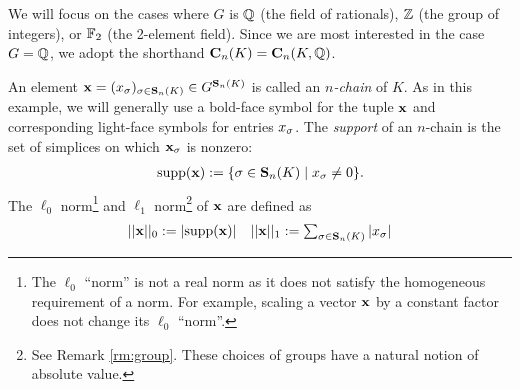 \begin{remark}\label{rm:group}
We will focus on the cases where $G$ is $\mathbb{Q}$ (the field of rationals), $\mathbb{Z}$ (the group of integers), or $\mathbb{F}_2$ (the 2-element field).  Since we are most interested in the case $G = \mathbb{Q}$, we adopt the shorthand $\mathbf{C}_n(K) = \mathbf{C}_n(K,\mathbb{Q})$. 
\end{remark}

An element $\mathbf{x} = (x_\sigma)_{\sigma \in \mathbf{S}_n(K)} \in G^{\mathbf{S}_n(K)}$ is called an \emph{$n$-chain} of $K$.   As  in this example, we will generally use a bold-face symbol for the tuple $\mathbf{x}$ and corresponding light-face symbols for entries $x_\sigma$.  The \emph{support} of an $n$-chain is the set of simplices on which $\mathbf{x}_\sigma$ is nonzero:  
%
    \begin{align*}
        \mathrm{supp}(\mathbf{x})  :=\{ \sigma \in \mathbf{S}_n(K) \mid x_\sigma \neq 0 \}.
    \end{align*}
%
The $\ell_0$ norm\footnote{The $\ell_0$ ``norm'' is not a real norm as it does not satisfy the homogeneous requirement of a norm. For example, scaling a vector $\mathbf{x}$ by a constant factor does not change its $\ell_0$ ``norm''.} and  $\ell_1$ norm\footnote{ See Remark \ref{rm:group}. These choices of groups have a natural notion of absolute value.} of $\mathbf{x}$ are defined as 
    \begin{align*}
        ||\mathbf{x}||_0 := |\mathrm{supp}(\mathbf{x}) |
        &&
        \textstyle
        ||\mathbf{x}||_1 := \sum_{ \sigma \in \mathbf{S}_n(K)} | x_\sigma  |
    \end{align*}

